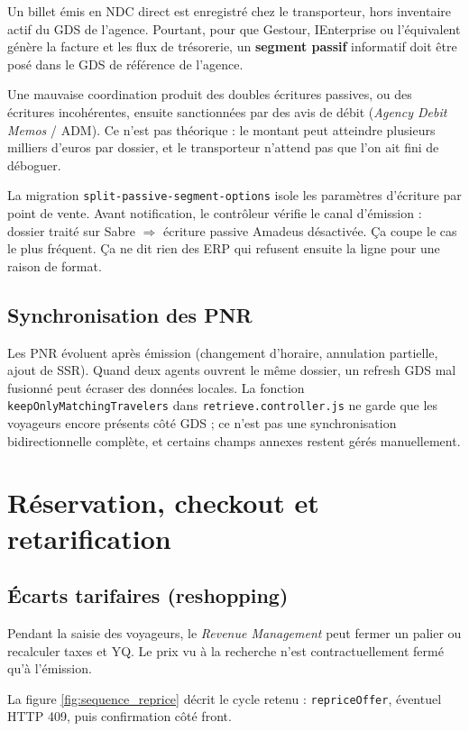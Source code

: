 Un billet émis en NDC direct est enregistré chez le transporteur, hors inventaire actif du GDS de l'agence. Pourtant, pour que Gestour, IEnterprise ou l'équivalent génère la facture et les flux de trésorerie, un \textbf{segment passif} informatif doit être posé dans le GDS de référence de l'agence.

Une mauvaise coordination produit des doubles écritures passives, ou des écritures incohérentes, ensuite sanctionnées par des avis de débit (\textit{Agency Debit Memos} / ADM). Ce n'est pas théorique : le montant peut atteindre plusieurs milliers d'euros par dossier, et le transporteur n'attend pas que l'on ait fini de déboguer.

La migration \texttt{split-passive-segment-options} isole les paramètres d'écriture par point de vente. Avant notification, le contrôleur vérifie le canal d'émission : dossier traité sur Sabre $\Rightarrow$ écriture passive Amadeus désactivée. Ça coupe le cas le plus fréquent. Ça ne dit rien des ERP qui refusent ensuite la ligne pour une raison de format.

\section{Synchronisation des PNR}

Les PNR évoluent après émission (changement d'horaire, annulation partielle, ajout de SSR). Quand deux agents ouvrent le même dossier, un refresh GDS mal fusionné peut écraser des données locales. La fonction \texttt{keepOnlyMatchingTravelers} dans \texttt{retrieve.controller.js} ne garde que les voyageurs encore présents côté GDS ; ce n'est pas une synchronisation bidirectionnelle complète, et certains champs annexes restent gérés manuellement.

\chapter{Réservation, checkout et retarification}
\label{chap:booking_reshop}

\section{Écarts tarifaires (reshopping)}

Pendant la saisie des voyageurs, le \textit{Revenue Management} peut fermer un palier ou recalculer taxes et YQ. Le prix vu à la recherche n'est contractuellement fermé qu'à l'émission.

La figure \ref{fig:sequence_reprice} décrit le cycle retenu : \texttt{repriceOffer}, éventuel HTTP 409, puis confirmation côté front.

